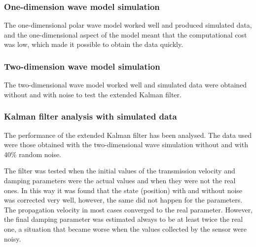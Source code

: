 \documentclass[12pt, a4paper]{article} %
\begin{document}
\setlength{\parskip}{0mm}

\subsubsection{One-dimension wave model simulation}

The one-dimensional polar wave model worked well and produced simulated data, and the one-dimensional aspect of the model meant that the computational cost was low, which made it possible to obtain the data quickly.

\setlength{\parskip}{0mm}

\subsubsection{Two-dimension wave model simulation}

The two-dimensional wave model worked well and simulated data were obtained without and with noise to test the extended Kalman filter.

\setlength{\parskip}{0mm}

\subsubsection{Kalman filter analysis with simulated data}

The performance of the extended Kalman filter has been analysed. The data used were those obtained with the two-dimensional wave simulation without and with 40\% random noise. 

\setlength{\parskip}{4mm}

The filter was tested when the initial values of the transmission velocity and damping parameters were the actual values and when they were not the real ones. In this way it was found that the state (position) with and without noise was corrected very well, however, the same did not happen for the parameters. The propagation velocity in most cases converged to the real parameter. However, the final damping parameter was estimated always to be at least twice the real one, a situation that became worse when the values collected by the sensor were noisy.
\end{document}
